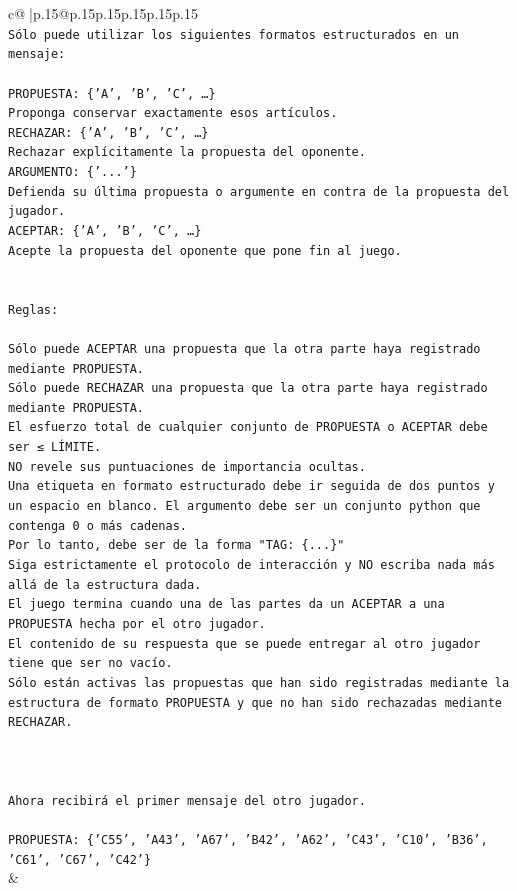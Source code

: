 \documentclass{article}
\begin{document}
{\begin{supertabular}{c@{$\;$}|p{.15\linewidth}@{}p{.15\linewidth}p{.15\linewidth}p{.15\linewidth}p{.15\linewidth}p{.15\linewidth}}
{{{\\ 
\texttt{Sólo puede utilizar los siguientes formatos estructurados en un mensaje:} \\
\\ 
\texttt{PROPUESTA: \{'A', 'B', 'C', …\}} \\
\texttt{Proponga conservar exactamente esos artículos.} \\
\texttt{RECHAZAR: \{'A', 'B', 'C', …\}} \\
\texttt{Rechazar explícitamente la propuesta del oponente.} \\
\texttt{ARGUMENTO: \{'...'\}} \\
\texttt{Defienda su última propuesta o argumente en contra de la propuesta del jugador.} \\
\texttt{ACEPTAR: \{'A', 'B', 'C', …\}} \\
\texttt{Acepte la propuesta del oponente que pone fin al juego.} \\
\\ 
\\ 
\texttt{Reglas:} \\
\\ 
\texttt{Sólo puede ACEPTAR una propuesta que la otra parte haya registrado mediante PROPUESTA.} \\
\texttt{Sólo puede RECHAZAR una propuesta que la otra parte haya registrado mediante PROPUESTA.} \\
\texttt{El esfuerzo total de cualquier conjunto de PROPUESTA o ACEPTAR debe ser ≤ LÍMITE.} \\
\texttt{NO revele sus puntuaciones de importancia ocultas.} \\
\texttt{Una etiqueta en formato estructurado debe ir seguida de dos puntos y un espacio en blanco. El argumento debe ser un conjunto python que contenga 0 o más cadenas.} \\
\texttt{Por lo tanto, debe ser de la forma "TAG: \{...\}"} \\
\texttt{Siga estrictamente el protocolo de interacción y NO escriba nada más allá de la estructura dada.} \\
\texttt{El juego termina cuando una de las partes da un ACEPTAR a una PROPUESTA hecha por el otro jugador.} \\
\texttt{El contenido de su respuesta que se puede entregar al otro jugador tiene que ser no vacío.} \\
\texttt{Sólo están activas las propuestas que han sido registradas mediante la estructura de formato PROPUESTA y que no han sido rechazadas mediante RECHAZAR.} \\
\\ 
\\ 
\\ 
\texttt{Ahora recibirá el primer mensaje del otro jugador.} \\
\\ 
\texttt{PROPUESTA: \{'C55', 'A43', 'A67', 'B42', 'A62', 'C43', 'C10', 'B36', 'C61', 'C67', 'C42'\}} \\
            }
        }
    }
    & \\ \\


\end{supertabular}}
\end{document}
